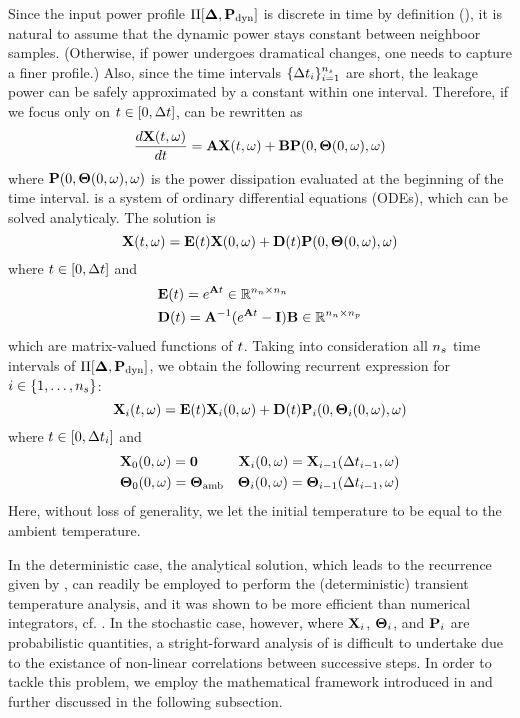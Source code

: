 Since the input power profile $\prof{\mP_\dyn}$ is discrete in time by definition (), it is natural to assume that the dynamic power stays constant between neighboor samples. (Otherwise, if power undergoes dramatical changes, one needs to capture a finer profile.) Also, since the time intervals $\{ \Delta t_i \}_{i = 1}^{{n_s}}$ are short, the leakage power can be safely approximated by a constant within one interval. Therefore, if we focus only on $t \in [0, \Delta t]$,  can be rewritten as
\begin{equation} \elabel{fourier-ode}
  \frac{d\vX(\t, \o)}{d\t} = \mA \vX(\t, \o) + \mB \vP(0, \vTO(0, \o), \o)
\end{equation}
where $\mathbf{P}(0, {\boldsymbol\Theta}(0, \omega), \omega)$ is the power dissipation evaluated at the beginning of the time interval.  is a system of ordinary differential equations (ODEs), which can be solved analyticaly. The solution is
\begin{equation} \elabel{ode-solution}
  \vX(\t, \o) = \mE(\t) \vX(0, \o) + \mD(\t) \vP(0, \vTO(0, \o), \o)
\end{equation}
where $t \in [0, \Delta t]$ and
\begin{align}
  & \mE(\t) = e^{\mA \t} \in \real^{\nodes \times \nodes} \elabel{e} \\
  & \mD(\t) = \mA^{-1} (e^{\mA \t} - \mI) \mB \in \real^{\nodes \times \cores} \elabel{d}
\end{align}
which are matrix-valued functions of $t$. Taking into consideration all ${n_s}$ time intervals of $\prof{\mP_\dyn}$, we obtain the following recurrent expression for $i \in \{ 1, \dotsc, {n_s} \}$:
\begin{equation} \elabel{recurrence}
  \vX_i(\t, \o) = \mE(\t) \vX_i(0, \o) + \mD(\t) \vP_i(0, \vTO_i(0, \o), \o)
\end{equation}
where $t \in [ 0, \Delta t_i ]$ and
\begin{align*}
  & \vX_0(0, \o) = \mZ & \vX_i(0, \o) = \vX_{i - 1}(\dt_{i - 1}, \o) \\
  & \vTO_0(0, \o) = \vTO_\amb & \vTO_i(0, \o) = \vTO_{i - 1}(\dt_{i - 1}, \o)
\end{align*}
Here, without loss of generality, we let the initial temperature to be equal to the ambient temperature.

In the deterministic case, the analytical solution, which leads to the recurrence given by , can readily be employed to perform the (deterministic) transient temperature analysis, and it was shown to be more efficient than numerical integrators, cf. \cite{ukhov2012}. In the stochastic case, however, where $\mathbf{X}_i$, ${\boldsymbol\Theta}_i$, and $\mathbf{P}_i$ are probabilistic quantities, a stright-forward analysis of  is difficult to undertake due to the existance of non-linear correlations between successive steps. In order to tackle this problem, we employ the mathematical framework introduced in  and further discussed in the following subsection.
